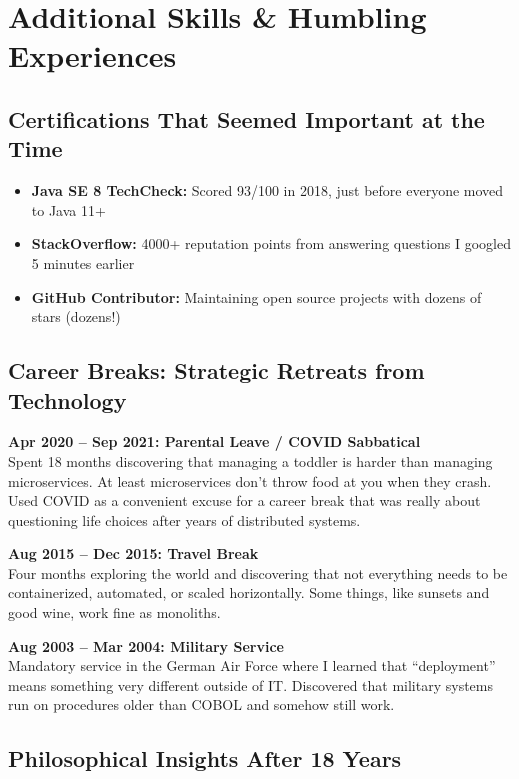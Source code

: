 \documentclass[10pt,a4paper]{article}
\begin{document}
\newpage

\section*{Additional Skills \& Humbling Experiences}

\subsection*{Certifications That Seemed Important at the Time}
\begin{itemize}
\item \textbf{Java SE 8 TechCheck:} Scored 93/100 in 2018, just before everyone moved to Java 11+
\item \textbf{StackOverflow:} 4000+ reputation points from answering questions I googled 5 minutes earlier
\item \textbf{GitHub Contributor:} Maintaining open source projects with dozens of stars (dozens!)
\end{itemize}

\subsection*{Career Breaks: Strategic Retreats from Technology}

\textbf{Apr 2020 -- Sep 2021: Parental Leave / COVID Sabbatical}\\
Spent 18 months discovering that managing a toddler is harder than managing microservices. At least microservices don't throw food at you when they crash. Used COVID as a convenient excuse for a career break that was really about questioning life choices after years of distributed systems.

\textbf{Aug 2015 -- Dec 2015: Travel Break}\\
Four months exploring the world and discovering that not everything needs to be containerized, automated, or scaled horizontally. Some things, like sunsets and good wine, work fine as monoliths.

\textbf{Aug 2003 -- Mar 2004: Military Service}\\
Mandatory service in the German Air Force where I learned that ``deployment'' means something very different outside of IT. Discovered that military systems run on procedures older than COBOL and somehow still work.

\subsection*{Philosophical Insights After 18 Years}
\end{document}
